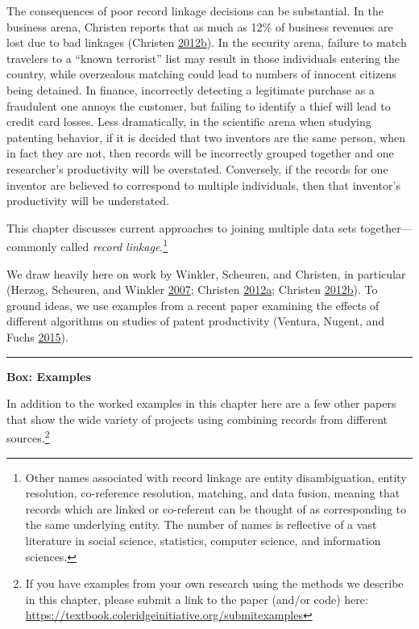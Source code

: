 \documentclass[]{krantz}
\begin{document}
The consequences of poor record linkage decisions can be substantial. In
the business arena, Christen reports that as much as 12\% of business
revenues are lost due to bad linkages (Christen
\protect\hyperlink{ref-christen2012data}{2012}\protect\hyperlink{ref-christen2012data}{b}).
In the security arena, failure to match travelers to a ``known
terrorist'' list may result in those individuals entering the country,
while overzealous matching could lead to numbers of innocent citizens
being detained. In finance, incorrectly detecting a legitimate purchase
as a fraudulent one annoys the customer, but failing to identify a thief
will lead to credit card losses. Less dramatically, in the scientific
arena when studying patenting behavior, if it is decided that two
inventors are the same person, when in fact they are not, then records
will be incorrectly grouped together and one researcher's productivity
will be overstated. Conversely, if the records for one inventor are
believed to correspond to multiple individuals, then that inventor's
productivity will be understated.

This chapter discusses current approaches to joining multiple data sets
together---commonly called \emph{record linkage}.\footnote{Other names
  associated with record linkage are entity disambiguation, entity
  resolution, co-reference resolution, matching, and data fusion,
  meaning that records which are linked or co-referent can be thought of
  as corresponding to the same underlying entity. The number of names is
  reflective of a vast literature in social science, statistics,
  computer science, and information sciences.}

We draw heavily here on work by Winkler, Scheuren, and Christen, in
particular (Herzog, Scheuren, and Winkler
\protect\hyperlink{ref-herzog2007data}{2007}; Christen
\protect\hyperlink{ref-christen2012survey}{2012}\protect\hyperlink{ref-christen2012survey}{a};
Christen
\protect\hyperlink{ref-christen2012data}{2012}\protect\hyperlink{ref-christen2012data}{b}).
To ground ideas, we use examples from a recent paper examining the
effects of different algorithms on studies of patent productivity
(Ventura, Nugent, and Fuchs
\protect\hyperlink{ref-ventura2015seeing}{2015}).

\begin{center}\rule{0.5\linewidth}{\linethickness}\end{center}

\textbf{Box: Examples}

In addition to the worked examples in this chapter here are a few other
papers that show the wide variety of projects using combining records
from different sources.\footnote{If you have examples from your own
  research using the methods we describe in this chapter, please submit
  a link to the paper (and/or code) here:
  \url{https://textbook.coleridgeinitiative.org/submitexamples}}
\end{document}
